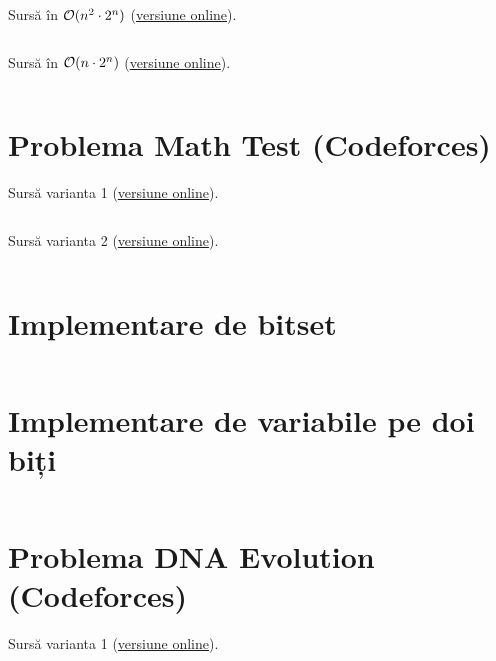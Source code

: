 \documentclass[../main.tex]{subfiles}
\begin{document}
Sursă în $\mathcal{O}(n^2 \cdot 2^n)$ (\href{https://codeforces.com/contest/279/submission/397247588}{versiune online}).

\inputminted{cpp}{../src/bit-mastery/the-minimum-number-of-variables-1.cpp}

Sursă în $\mathcal{O}(n \cdot 2^n)$ (\href{https://codeforces.com/contest/279/submission/397247470}{versiune online}).

\inputminted{cpp}{../src/bit-mastery/the-minimum-number-of-variables-1.cpp}

\section{Problema Math Test (Codeforces)}
\label{code:math-test}

Sursă varianta 1 (\href{https://codeforces.com/contest/1622/submission/290665988}{versiune online}).

\inputminted{cpp}{../src/bit-mastery/math-test-1.cpp}

Sursă varianta 2 (\href{https://codeforces.com/contest/1622/submission/290673874}{versiune online}).

\inputminted{cpp}{../src/bit-mastery/math-test-2.cpp}

\section{Implementare de bitset}
\label{code:bitset}

\inputminted{cpp}{../src/bit-mastery/bitset.cpp}

\section{Implementare de variabile pe doi biți}
\label{code:compact-2-bit}

\inputminted{cpp}{../src/bit-mastery/compact-2-bit.cpp}

\section{Problema DNA Evolution (Codeforces)}
\label{code:dna-evolution}

Sursă varianta 1 (\href{https://codeforces.com/contest/827/submission/291031701}{versiune online}).

\inputminted{cpp}{../src/bit-mastery/dna-evolution-1.cpp}
\end{document}
